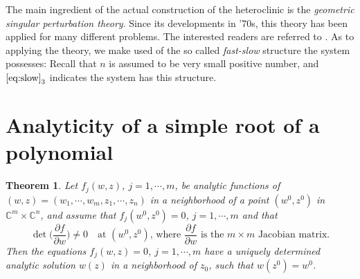 \documentclass[a4paper,11pt]{article}
\newtheorem{theorem}{Theorem}
\theoremstyle{remark}
\begin{document}
The main ingredient of the actual construction of the heteroclinic is the {\it geometric singular perturbation theory}. Since its developments in '70s, this theory has been applied  for many different problems. The interested readers are referred to \cite{Fenichel79}. As to applying the theory, we make used of the so called {\it fast-slow} structure the system possesses: Recall that $n$ is assumed to be very small positive number, and $\eqref{eq:slow}_3$ indicates the system has this structure.
%
%
%
%


\pagebreak

\appendix
\renewcommand\thetheorem{\Alph{theorem}}
\setcounter{theorem}{\thetmp}
\section{Analyticity of a simple root of a polynomial}



\begin{theorem}{\cite[p. 24]{Hormander66}} \label{thm:anal} Let $f_j(w,z)$, $j=1,\cdots,m$, be analytic functions of $(w,z)=(w_1,\cdots,w_m,z_1,\cdots,z_n)$ in a neighborhood of a point $(w^0,z^0)$ in $\mathbb{C}^m\times \mathbb{C}^n$, and assume that $f_j(w^0,z^0)=0$, $j=1,\cdots,m$ and that
$$ \det\Big( \frac{\partial f}{\partial w} \Big) \ne 0 \quad \text{at $(w^0,z^0)$, where $\frac{\partial f}{\partial w}$ is the $m\times m$ Jacobian matrix.} $$
Then the equations $f_j(w,z)=0$, $j=1,\cdots,m$ have a uniquely determined analytic solution $w(z)$ in a neighborhood of $z_0$, such that $w(z^0)=w^0$.
\end{theorem}
\end{document}
